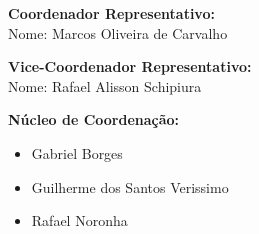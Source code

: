 \documentclass[11pt,a4paper]{article}
\begin{document}
\vspace{2cm}

\noindent\textbf{Coordenador Representativo:} \\
Nome: Marcos Oliveira de Carvalho \\


\vspace{1.5cm}

\noindent\textbf{Vice-Coordenador Representativo:} \\
Nome: Rafael Alisson Schipiura \\


\vspace{2cm}

\noindent\textbf{Núcleo de Coordenação:} \\{}
\noindent
\begin{itemize}
    \item Gabriel Borges
    \item Guilherme dos Santos Verissimo
    \item Rafael Noronha
\end{itemize}
\end{document}

